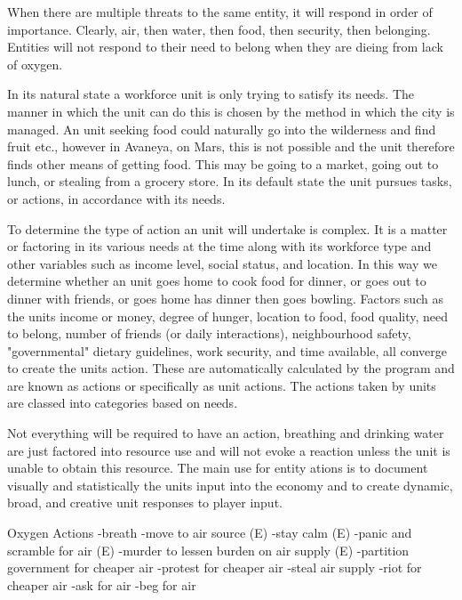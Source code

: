 When there are multiple threats to the same entity, it will respond in order of importance. Clearly, air, then water, then food, then security, then belonging. Entities will not respond to their need to belong when they are dieing from lack of oxygen.

In its natural state a workforce unit is only trying to satisfy its needs. The manner in which the unit can do this is chosen by the method in which the city is managed. An unit seeking food could naturally go into the wilderness and find fruit etc., however in Avaneya, on Mars, this is not possible and the unit therefore finds other means of getting food. This may be going to a market, going out to lunch, or stealing from a grocery store. In its default state the unit pursues tasks, or actions, in accordance with its needs.

To determine the type of action an unit will undertake is complex. It is a matter or factoring in its various needs at the time along with its workforce type and other variables such as income level, social status, and location. In this way we determine whether an unit goes home to cook food for dinner, or goes out to dinner with friends, or goes home has dinner then goes bowling. Factors such as the units income or money, degree of hunger, location to food, food quality, need to belong, number of friends (or daily interactions), neighbourhood safety, "governmental" dietary guidelines, work security, and time available, all converge to create the units action. These are automatically calculated by the program and are known as actions or specifically as unit actions. The actions taken by units are classed into categories based on needs. 

Not everything will be required to have an action, breathing and drinking water are just factored into resource use and will not evoke a reaction unless the unit is unable to obtain this resource. The main use for entity ations is to document visually and statistically the units input into the economy and to create dynamic, broad, and creative unit responses to player input.

Oxygen Actions
-breath 
-move to air source (E)
-stay calm (E)
-panic and scramble for air (E)
-murder to lessen burden on air supply (E)
-partition government for cheaper air
-protest for cheaper air
-steal air supply
-riot for cheaper air
-ask for air
-beg for air

